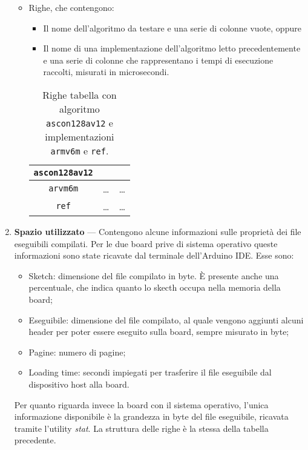\begin{enumerate}[label=\Roman*.]
\begin{itemize}
        \item Righe, che contengono:
            \begin{itemize}
                \item Il nome dell'algoritmo da testare e una serie di colonne vuote, oppure
                \item Il nome di una implementazione dell'algoritmo letto precedentemente e una serie di colonne che rappresentano i tempi di esecuzione raccolti, misurati in microsecondi.
            \end{itemize}
            \begin{table}[H]
                \centering
            	\begin{tabular}{|c|c|c|}
            		\hline
                    \texttt{ascon128av12} & & \\
                    \hline
                    \texttt{arvm6m} & \dots & \dots \\
                    \hline
                    \texttt{ref} & \dots & \dots \\
            		\hline
                \end{tabular}
                \caption{Righe tabella con algoritmo \texttt{ascon128av12} e implementazioni \texttt{armv6m} e \texttt{ref}.}
            \end{table}
    \end{itemize}
    \item \textbf{Spazio utilizzato} --- Contengono alcune informazioni sulle proprietà dei file eseguibili compilati. Per le due board prive di sistema operativo queste informazioni sono state ricavate dal terminale dell'Arduino IDE. Esse sono:
    \begin{itemize}
        \item Sketch: dimensione del file compilato in byte. È presente anche una percentuale, che indica quanto lo skecth occupa nella memoria della board;
        \item Eseguibile: dimensione del file compilato, al quale vengono aggiunti alcuni header per poter essere eseguito sulla board, sempre misurato in byte;
        \item Pagine: numero di pagine;
        \item Loading time: secondi impiegati per trasferire il file eseguibile dal dispositivo host alla board.
    \end{itemize}
    Per quanto riguarda invece la board con il sistema operativo, l'unica informazione disponibile è la grandezza in byte del file eseguibile, ricavata tramite l'utility \textit{stat}. La struttura delle righe è la stessa della tabella precedente.
\end{enumerate}

